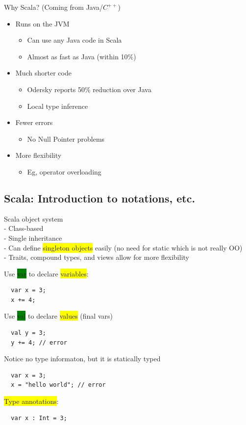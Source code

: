 \documentclass[tikz,border=10pt]{project_plan}
\begin{document}
Why Scala? (Coming from Java/$C^{++}$)
\begin{itemize}
  \item Runs on the JVM
        \begin{itemize}
          \item Can use any Java code in Scala
          \item Almost as fast as Java (within 10\%)
        \end{itemize}
  \item Much shorter code
        \begin{itemize}
          \item Odersky reports 50\% reduction over Java
          \item Local type inference
        \end{itemize}
  \item Fewer errors
        \begin{itemize}
          \item No Null Pointer problems
        \end{itemize}
  \item More flexibility
        \begin{itemize}
          \item Eg, operator overloading
        \end{itemize}
\end{itemize}

\subsection{Scala: Introduction to notations, etc.}

Scala object system\\
- Class-based\\
- Single inheritance\\
- Can define \colorbox{yellow}{singleton objects} easily (no need for static which is not really OO)\\
- Traits, compound types, and views allow for more flexibility

Use \colorbox{green}{var} to declare \colorbox{yellow}{variables}:
\begin{lstlisting}
  var x = 3;
  x += 4;
\end{lstlisting}
Use \colorbox{green}{val} to declare \colorbox{yellow}{values} (final vars)
\begin{lstlisting}
  val y = 3;
  y += 4; // error
\end{lstlisting}
Notice no type informaton, but it is statically typed
\begin{lstlisting}
  var x = 3;
  x = "hello world"; // error
\end{lstlisting}
\colorbox{yellow}{Type annotations}:
\begin{lstlisting}
  var x : Int = 3;
\end{lstlisting}
\end{document}

